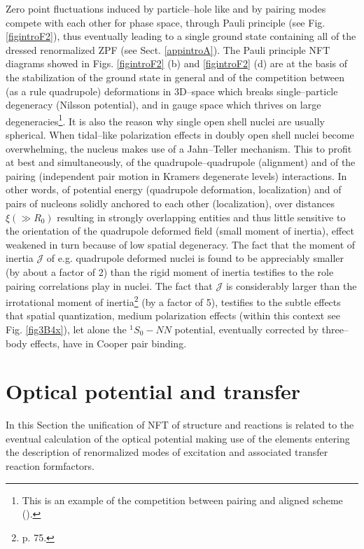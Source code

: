 Zero point fluctuations induced by particle--hole like and by pairing modes compete with each other for phase space, through Pauli principle (see Fig. \ref{figintroF2}), thus eventually leading to a single ground state containing all of the dressed renormalized ZPF (see Sect. \ref{appintroA}). The Pauli principle NFT diagrams showed in Figs. \ref{figintroF2} (b) and \ref{figintroF2} (d) are at the basis of the stabilization of the ground state in general and of the competition between (as a rule quadrupole) deformations in 3D--space which breaks single--particle degeneracy (Nilsson potential), and in gauge space which thrives on large degeneracies\footnote{This is an example of the competition between pairing and aligned scheme (\cite{Bayman:61,Bes:69,Mottelson:62,Bohr:75}).}. It is also the reason why single open shell nuclei are usually spherical. When tidal--like polarization effects in doubly open shell nuclei become overwhelming, the nucleus makes use of a Jahn--Teller mechanism. This to profit at best and simultaneously, of the quadrupole--quadrupole (alignment) and of the pairing (independent pair motion in Kramers degenerate levels) interactions. In other words, of potential energy (quadrupole deformation, localization) and of pairs of nucleons solidly anchored to each other (localization), over distances $\xi (\gg R_0)$ resulting in strongly overlapping entities and thus little sensitive to the orientation of the quadrupole deformed field (small moment of inertia), effect weakened in turn because of low spatial degeneracy. The fact that the moment of inertia $\mathcal J$ of e.g. quadrupole deformed nuclei is found to be appreciably smaller (by about a factor of 2) than the rigid moment of inertia testifies to the role pairing correlations play in nuclei. The fact that $\mathcal J$ is considerably larger than the irrotational moment of inertia\footnote{\cite{Bohr:75} p. 75.} (by a factor of 5), testifies to the subtle effects that spatial quantization, medium polarization effects (within this context see Fig. \ref{fig3B4x}), let alone the $^1S_0-NN$ potential, eventually corrected by  three--body effects, have in Cooper pair binding.
\newpage

\section{Optical potential and transfer}\label{C1S9}
In this Section the unification of NFT of structure and reactions is related to the eventual calculation of the optical potential making use of the elements entering the description of renormalized modes of excitation and associated transfer reaction formfactors. 
